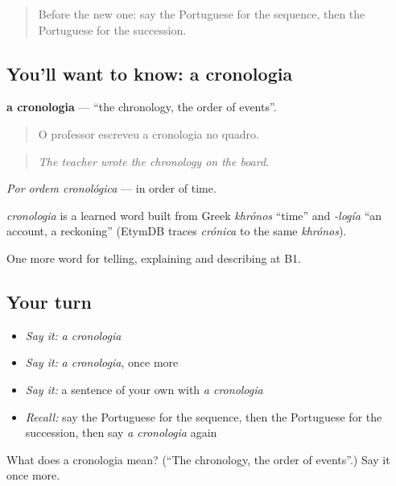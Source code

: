 \label{lesson:PT-C273-cronologia}



\begin{quote}
Before the new one: say the Portuguese for the sequence, then the Portuguese for the succession.
\end{quote}

\subsection*{You'll want to know: a cronologia}
\textbf{a cronologia} — \textquotedblleft{}the chronology, the order of events\textquotedblright{}.

\begin{quote}
O professor escreveu a cronologia no quadro.
\end{quote}

\begin{quote}
\emph{The teacher wrote the chronology on the board.}
\end{quote}

\emph{Por ordem cronológica} — in order of time.

\begin{cousinweb}
\emph{cronologia} is a learned word built from Greek \emph{khrónos} \textquotedblleft{}time\textquotedblright{} and \emph{-logía} \textquotedblleft{}an account, a reckoning\textquotedblright{} (EtymDB traces \emph{crónica} to the same \emph{khrónos}).
\end{cousinweb}

\begin{grammarlens}[title={What you've built}]
One more word for telling, explaining and describing at B1.
\end{grammarlens}

\subsection*{Your turn}
\begin{itemize}
\raggedright
  \item \emph{Say it:} \emph{a cronologia}
  \item \emph{Say it:} \emph{a cronologia}, once more
  \item \emph{Say it:} a sentence of your own with \emph{a cronologia}
  \item \emph{Recall:} say the Portuguese for the sequence, then the Portuguese for the succession, then say \emph{a cronologia} again
\end{itemize}

\begin{tcolorbox}[breakable,colback=teal!4,colframe=teal!35!black,title={Before you move on}]
What does a cronologia mean? (\textquotedblleft{}The chronology, the order of events\textquotedblright{}.) Say it once more.
\end{tcolorbox}
